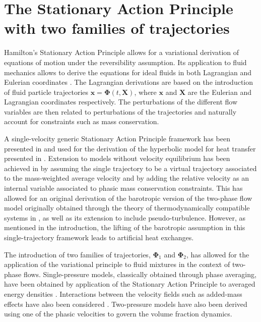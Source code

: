 \documentclass{myclass}
\newcommand{\Traj}{\bm{\Phi}}
\begin{document}
\section{The Stationary Action Principle with two families of trajectories}\label{sec:SAP_framework}

Hamilton's Stationary Action Principle allows for a variational derivation of equations of motion under the reversibility assumption. Its application to fluid mechanics allows to derive the equations for ideal fluids in both Lagrangian and Eulerian coordinates \cite{bretherton:1970,salmon:1988,serre:1993}.
The Lagrangian derivations are based on the introduction of fluid particle trajectories $\bm{x}=\Traj(t,\bm{X})$, where $\bm{x}$ and $\bm{X}$ are the Eulerian and Lagrangian coordinates respectively. The perturbations of the different flow variables are then related to perturbations of the trajectories and naturally account for constraints such as mass conservation. 

A single-velocity generic Stationary Action Principle framework has been presented in \cite{haegeman_GenSAP:2025} and used for the derivation of the hyperbolic model for heat transfer presented in \cite{dhaouadi:2024}. Extension to models without velocity equilibrium has been achieved in \cite{haegeman_RelVel:2025} by assuming the single trajectory to be a virtual trajectory associated to the mass-weighted average velocity and by adding the relative velocity as an internal variable associated to phasic mass conservation constraints. This has allowed for an original derivation of the barotropic version of the two-phase flow model originally obtained through the theory of thermodynamically compatible systems in \cite{romenski:2004, romenski:2007, romenski:2010}, as well as its extension to include pseudo-turbulence. However, as mentioned in the introduction, the lifting of the barotropic assumption in this single-trajectory framework leads to artificial heat exchanges.

The introduction of two families of trajectories, $\Traj_1$ and $\Traj_2$, has allowed for the application of the variational principle to fluid mixtures in the context of two-phase flows. Single-pressure models, classically obtained through phase averaging, have been obtained by application of the Stationary Action Principle to averaged energy densities \cite{bedford:1978}. Interactions between the velocity fields such as added-mass effects have also been considered \cite{geurst:1986}. Two-pressure models have also been derived \cite{gavrilyuk:2002} using one of the phasic velocities to govern the volume fraction dynamics. 
\end{document}
